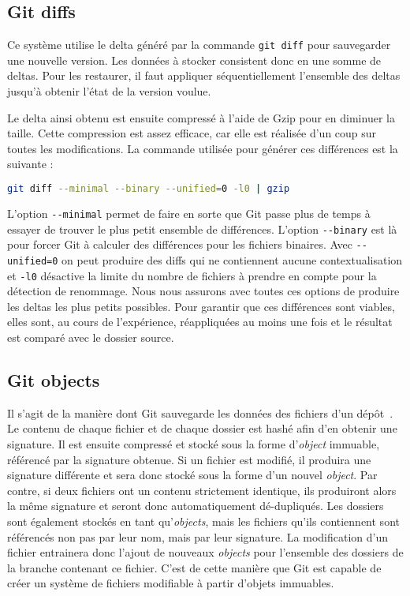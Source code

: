 \documentclass[a4paper]{report}
\begin{document}
\subsection{Git diffs}
\label{sec:git-diffs}

Ce système utilise le delta généré par la commande \verb|git diff|
pour sauvegarder une nouvelle version. Les données à stocker consistent
donc en une somme de deltas. Pour les restaurer, il faut
appliquer séquentiellement l'ensemble des deltas jusqu'à obtenir l'état
de la version voulue.

Le delta ainsi obtenu est ensuite compressé à l'aide de Gzip pour en diminuer la taille.
Cette compression est assez efficace, car elle est réalisée d'un coup sur toutes les modifications.
La commande utilisée pour générer ces différences est la suivante :

\begin{lstlisting}[language=sh]
git diff --minimal --binary --unified=0 -l0 | gzip
\end{lstlisting}

L'option \verb|--minimal| permet de faire en sorte que Git passe plus de temps
à essayer de trouver le plus petit ensemble de différences.
L'option \verb|--binary| est là pour forcer Git
à calculer des différences pour les fichiers binaires.
Avec \verb|--unified=0| on peut produire des diffs
qui ne contiennent aucune contextualisation
et \verb|-l0| désactive la limite du nombre de fichiers
à prendre en compte pour la détection de renommage.
Nous nous assurons avec toutes ces options de produire les deltas les plus petits possibles.
Pour garantir que ces différences sont viables,
elles sont, au cours de l'expérience, réappliquées au moins une fois
et le résultat est comparé avec le dossier source.

\subsection{Git objects}

Il s'agit de la manière dont Git
sauvegarde les données des fichiers d'un dépôt~\cite{straub2013git}. Le contenu de chaque
fichier et de chaque dossier est hashé afin d'en obtenir une signature.
Il est ensuite compressé et stocké sous la forme d'\emph{object}
immuable, référencé par la signature obtenue. Si un fichier est modifié,
il produira une signature différente et sera donc stocké sous la forme
d'un nouvel \emph{object}. Par contre, si deux fichiers ont un contenu
strictement identique, ils produiront alors la même signature et seront
donc automatiquement dé-dupliqués. Les dossiers sont également stockés
en tant qu'\emph{objects}, mais les fichiers qu'ils contiennent sont
référencés non pas par leur nom, mais par leur signature. La
modification d'un fichier entrainera donc l'ajout de nouveaux
\emph{objects} pour l'ensemble des dossiers de la branche contenant ce
fichier. C'est de cette manière que Git est capable de créer un système
de fichiers modifiable à partir d'objets immuables.
\end{document}
